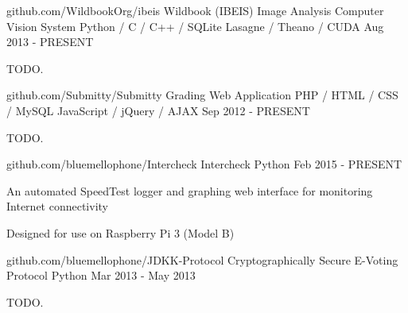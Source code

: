 

\begin{cventries}

  \cventry
    {github.com/WildbookOrg/ibeis} %
    {Wildbook (IBEIS) Image Analysis Computer Vision System} %
    {Python / C / C++ / SQLite \newline Lasagne / Theano / CUDA} %
    {Aug 2013 - PRESENT} %
    {
      \begin{cvitems} %
        \item {TODO.}
      \end{cvitems}
    }

  \cventry
    {github.com/Submitty/Submitty} %
    {Grading Web Application} %
    {PHP / HTML / CSS / MySQL \newline JavaScript / jQuery / AJAX } %
    {Sep 2012 - PRESENT} %
    {
      \begin{cvitems} %
        \item {TODO.}
      \end{cvitems}
    }

  \cventry
    {github.com/bluemellophone/Intercheck} %
    {Intercheck} %
    {Python} %
    {Feb 2015 - PRESENT} %
    {
      \begin{cvitems} %
        \item {An automated SpeedTest logger and graphing web interface for monitoring Internet connectivity}
        \item {Designed for use on Raspberry Pi 3 (Model B)}
      \end{cvitems}
    }

  \cventry
    {github.com/bluemellophone/JDKK-Protocol} %
    {Cryptographically Secure E-Voting Protocol} %
    {Python} %
    {Mar 2013 - May 2013} %
    {
      \begin{cvitems} %
        \item {TODO.}
      \end{cvitems}
    }


\end{cventries}
